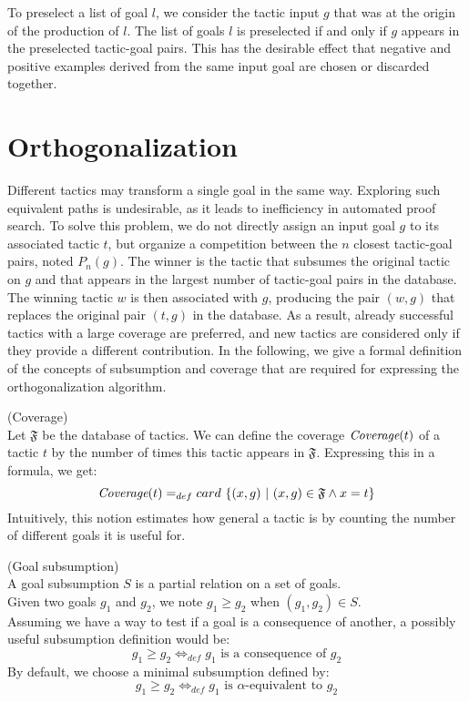\documentclass[runningheads,a4paper,draft]{svjour3}
\begin{document}
To preselect a list of goal $l$, we consider the tactic input $g$ that was 
at the origin of the production of $l$. The list of goals $l$ is preselected if 
and only if $g$ appears in the preselected tactic-goal pairs. This has the 
desirable effect that negative and positive examples derived from the same 
input goal are chosen or discarded together.  

\section{Orthogonalization}\label{sec:ortho}
Different tactics may transform a single goal in the same way. Exploring such 
equivalent paths
is undesirable, as it leads to inefficiency in automated proof search.
To solve this problem, we do not directly assign an input goal $g$ to its 
associated tactic $t$, but organize a competition between the $n$ closest 
tactic-goal pairs, noted $P_n(g)$. 
The winner is the tactic that subsumes the original tactic on $g$ and that
appears in the largest number of tactic-goal pairs in the database.
The winning tactic $w$ is then associated with $g$, producing the pair $(w,g)$ 
that replaces the original pair $(t,g)$ in the database. As a 
result, already successful tactics with a large coverage are preferred, and new 
tactics are 
considered only if they provide a different contribution. In the following, we 
give a formal definition of the concepts of subsumption and coverage that are 
required for expressing the orthogonalization algorithm.

\begin{definition} (Coverage)\\ 
Let $\mathfrak{F}$ be the database of tactics. We can define the 
coverage $\textit{\mbox{Coverage}}(t)$ of a tactic $t$ by the number of times 
this tactic 
appears in 
$\mathfrak{F}$. Expressing this in a formula, we get:
  \[\textit{\mbox{Coverage}}(t) =_{def} card\ \lbrace (x,g)\ |\ (x,g) \in 
  \mathfrak{F} 
  \wedge x 
  = t
  \rbrace  \]
Intuitively, this notion estimates how general a tactic is by counting the 
number of different goals it is useful for.
\end{definition}


\begin{definition} (Goal subsumption)\\ 
A goal subsumption $S$ is a partial relation on a set of goals.\\
Given two goals $g_1$ and $g_2$, we note $g_1 \ge g_2$ when  $(g_1,g_2) \in 
S$.\\
Assuming we have a way to test if a goal is a consequence of another, a 
possibly useful subsumption definition would be: 
\[g_1 \ge g_2  \Leftrightarrow_{def} g_1 \mbox{ is a consequence of } g_2\]
By default, we choose a minimal subsumption defined by:
\[g_1 \ge g_2  \Leftrightarrow_{def} g_1 \mbox{ is }\alpha\mbox{-equivalent 
to } g_2\]
\end{definition}
\end{document}
